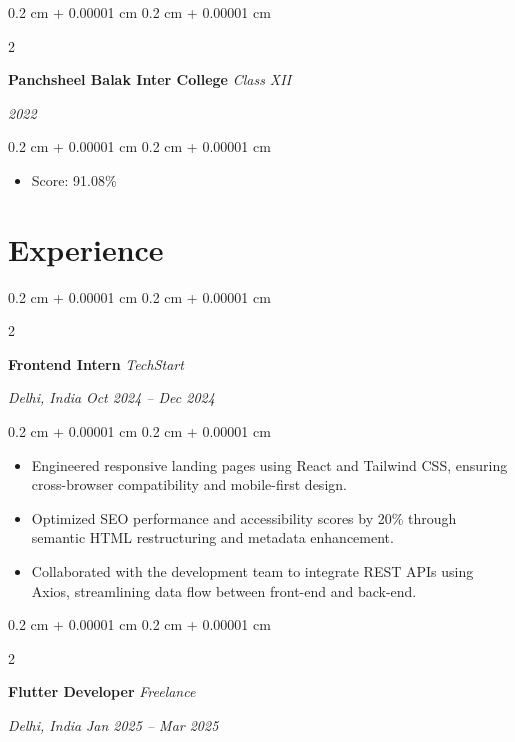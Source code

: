 \documentclass[10pt, a4paper]{article}
\newenvironment{highlights}{
    \begin{itemize}[
        topsep=0.10 cm,
        parsep=0.10 cm,
        partopsep=0pt,
        itemsep=0pt,
        leftmargin=0.4 cm + 10pt
    ]
}{
    \end{itemize}
} %
\newenvironment{onecolentry}{
    \begin{adjustwidth}{
        0.2 cm + 0.00001 cm
    }{
        0.2 cm + 0.00001 cm
    }
}{
    \end{adjustwidth}
} %
\newenvironment{twocolentry}[2][]{
    \onecolentry
    \def\secondColumn{#2}
    \setcolumnwidth{\fill, 4.5 cm}
    \begin{paracol}{2}
}{
    \switchcolumn \raggedleft \secondColumn
    \end{paracol}
    \endonecolentry
} %
\begin{document}
    \begin{twocolentry}{
        \textit{2022}
    }
    \textbf{Panchsheel Balak Inter College}
    \textit{Class XII}
    \end{twocolentry}
    \vspace{0.10 cm}
    \begin{onecolentry}
    \begin{highlights}
        \item Score: 91.08\%
    \end{highlights}
    \end{onecolentry}
    

    \section{Experience}

        \begin{twocolentry}{
            \textit{Delhi, India}    
            \textit{Oct 2024 -- Dec 2024}
        }
        \textbf{Frontend Intern}
        \textit{TechStart}
        \end{twocolentry}

        \vspace{0.10 cm}
        \begin{onecolentry}
        \begin{highlights}
            \item Engineered responsive landing pages using React and Tailwind CSS, ensuring cross-browser compatibility and mobile-first design.
\item Optimized SEO performance and accessibility scores by 20\% through semantic HTML restructuring and metadata enhancement.
\item Collaborated with the development team to integrate REST APIs using Axios, streamlining data flow between front-end and back-end.
        \end{highlights}
        \end{onecolentry}
        \vspace{0.2 cm}
        

        \begin{twocolentry}{
            \textit{Delhi, India}    
            \textit{Jan 2025 -- Mar 2025}
        }
        \textbf{Flutter Developer}
        \textit{Freelance}
        \end{twocolentry}
\end{document}

